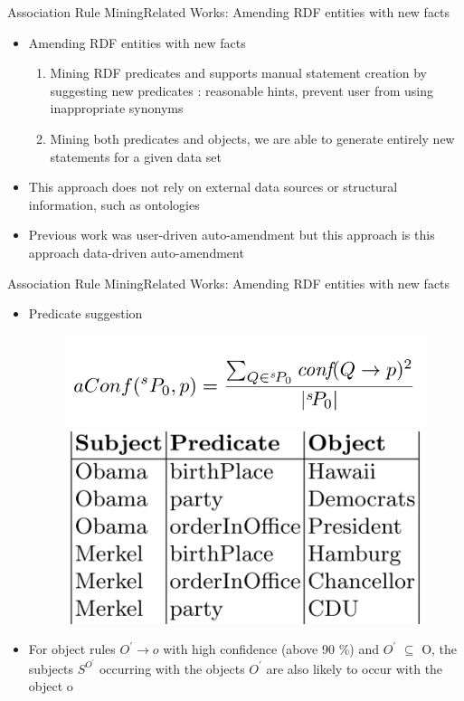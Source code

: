 \documentclass[10pt]{beamer}
\begin{document}
\begin{frame}{Association Rule Mining}{Related Works:  Amending RDF entities with new facts}
\begin{itemize}
\item Amending RDF entities with new facts \cite{abedjan2014amending}
\begin{enumerate}
\item Mining RDF predicates and supports manual statement creation by suggesting new predicates : reasonable hints, prevent user from using inappropriate synonyms 
\item Mining both predicates and objects, we are able to generate entirely new statements for a given data set


\end{enumerate}
\item This approach does not rely on external data sources or structural information, such as ontologies
\item  Previous work \cite{abedjan2013improving} was user-driven auto-amendment but this approach is this approach data-driven auto-amendment
\end{itemize}
\end{frame}



\begin{frame}{Association Rule Mining}{Related Works:  Amending RDF entities with new facts}
\begin{itemize}
\item Predicate suggestion
\begin{figure} 
\includegraphics[width=.5\linewidth]{images/suggestion-formula.PNG}
\includegraphics[width=.4\linewidth]{images/predicate-suggestion.PNG}
\end{figure}
\item For object rules $O^\prime \rightarrow o$ with high confidence (above 90 $\%$) and $O^\prime$ $ \subseteq$ O, the subjects  $S^{O^\prime} $	occurring with the objects $O^\prime$ are also likely to occur with the	object o

\end{itemize}
\end{frame}
\end{document}
